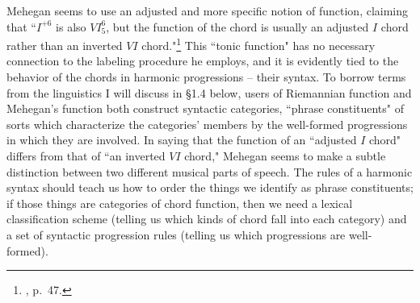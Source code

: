 Mehegan seems to use an adjusted and more specific notion of function, claiming that ``$I^{+6}$ is also $VI^{6}_5$, but the function of the chord is usually an adjusted $I$ chord rather than an inverted $VI$ chord."\footnote{\cite{mehegan1959}, p.\ 47.}  This ``tonic function" has no necessary connection to the labeling procedure he employs, and it is evidently tied to the behavior of the chords in harmonic progressions -- their syntax.  To borrow terms from the linguistics I will discuss in \S 1.4 below, users of Riemannian function and Mehegan's function both construct syntactic categories, ``phrase constituents" of sorts which characterize the categories' members by the well-formed progressions in which they are involved.  In saying that the function of an ``adjusted $I$ chord" differs from that of ``an inverted $VI$ chord," Mehegan seems to make a subtle distinction between two different musical parts of speech.  The rules of a harmonic syntax should teach us how to order the things we identify as phrase constituents; if those things are categories of chord function, then we need a lexical classification scheme (telling us which kinds of chord fall into each category) and a set of syntactic progression rules (telling us which progressions are well-formed).

